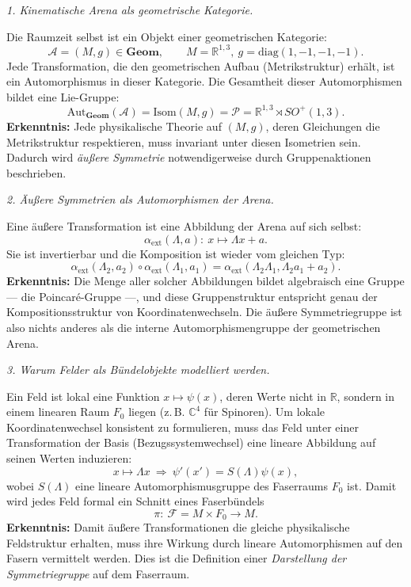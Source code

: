 \documentclass[10pt, letterpaper]{article}
\newcommand{\R}{\mathbb{R}}
\newcommand{\C}{\mathbb{C}}
\newcommand{\Aut}{\mathrm{Aut}}
\begin{document}
\bigskip
\emph{1. Kinematische Arena als geometrische Kategorie.}

Die Raumzeit selbst ist ein Objekt einer geometrischen Kategorie:
\[
\mathcal A=(M,g)\in\mathbf{Geom},\qquad M=\R^{1,3},\ g=\mathrm{diag}(1,-1,-1,-1).
\]
Jede Transformation, die den geometrischen Aufbau (Metrikstruktur) erhält, ist ein
Automorphismus in dieser Kategorie.
Die Gesamtheit dieser Automorphismen bildet eine Lie-Gruppe:
\[
\Aut_{\mathbf{Geom}}(\mathcal A)=\mathrm{Isom}(M,g)=\mathcal P
=\R^{1,3}\rtimes SO^+(1,3).
\]
\textbf{Erkenntnis:}
Jede physikalische Theorie auf $(M,g)$, deren Gleichungen die Metrikstruktur respektieren,
muss invariant unter diesen Isometrien sein.
Dadurch wird \emph{äußere Symmetrie} notwendigerweise durch Gruppenaktionen beschrieben.

\bigskip
\emph{2. Äußere Symmetrien als Automorphismen der Arena.}

Eine äußere Transformation ist eine Abbildung der Arena auf sich selbst:
\[
\alpha_{\mathrm{ext}}(\Lambda,a):\ x\mapsto \Lambda x + a.
\]
Sie ist invertierbar und die Komposition ist wieder vom gleichen Typ:
\[
\alpha_{\mathrm{ext}}(\Lambda_2,a_2)\circ\alpha_{\mathrm{ext}}(\Lambda_1,a_1)
=\alpha_{\mathrm{ext}}(\Lambda_2\Lambda_1,\Lambda_2 a_1+a_2).
\]
\textbf{Erkenntnis:}
Die Menge aller solcher Abbildungen bildet algebraisch eine Gruppe
— die Poincaré-Gruppe —, und diese Gruppenstruktur entspricht genau der Kompositionsstruktur
von Koordinatenwechseln.  
Die äußere Symmetriegruppe ist also nichts anderes als die interne Automorphismengruppe
der geometrischen Arena.

\bigskip
\emph{3. Warum Felder als Bündelobjekte modelliert werden.}

Ein Feld ist lokal eine Funktion \(x\mapsto \psi(x)\), deren Werte nicht in \(\R\),
sondern in einem linearen Raum \(F_0\) liegen (z.\,B. $\C^4$ für Spinoren).  
Um lokale Koordinatenwechsel konsistent zu formulieren, muss das Feld unter
einer Transformation der Basis (Bezugssystemwechsel) eine lineare Abbildung
auf seinen Werten induzieren:
\[
x\mapsto \Lambda x\ \Rightarrow\
\psi'(x')=S(\Lambda)\psi(x),
\]
wobei \(S(\Lambda)\) eine lineare Automorphismusgruppe des Faserraums $F_0$ ist.
Damit wird jedes Feld formal ein Schnitt eines Faserbündels
\[
\pi:\ \mathcal F = M\times F_0 \to M.
\]
\textbf{Erkenntnis:}
Damit äußere Transformationen die gleiche physikalische Feldstruktur erhalten,
muss ihre Wirkung durch lineare Automorphismen auf den Fasern vermittelt werden.
Dies ist die Definition einer \emph{Darstellung der Symmetriegruppe} auf dem Faserraum.  
\end{document}
